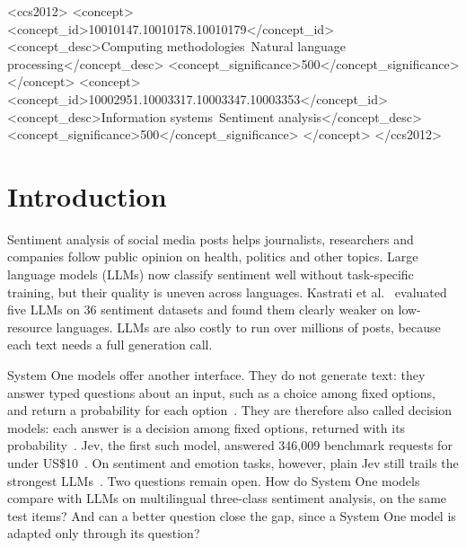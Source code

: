 \documentclass[sigconf]{acmart}
\begin{document}
\begin{CCSXML}
<ccs2012>
 <concept>
  <concept_id>10010147.10010178.10010179</concept_id>
  <concept_desc>Computing methodologies~Natural language processing</concept_desc>
  <concept_significance>500</concept_significance>
 </concept>
 <concept>
  <concept_id>10002951.10003317.10003347.10003353</concept_id>
  <concept_desc>Information systems~Sentiment analysis</concept_desc>
  <concept_significance>500</concept_significance>
 </concept>
</ccs2012>
\end{CCSXML}



\maketitle

\section{Introduction}
Sentiment analysis of social media posts helps journalists, researchers and companies follow public opinion on health, politics and other topics. Large language models (LLMs) now classify sentiment well without task-specific training, but their quality is uneven across languages. Kastrati et al.~\cite{kastrati2026language} evaluated five LLMs on 36 sentiment datasets and found them clearly weaker on low-resource languages. LLMs are also costly to run over millions of posts, because each text needs a full generation call.

System One models offer another interface. They do not generate text: they answer typed questions about an input, such as a choice among fixed options, and return a probability for each option~\cite{typesafe2026jev}. They are therefore also called decision models: each answer is a decision among fixed options, returned with its probability~\cite{deusser2026jev,zhang2026decide}. Jev, the first such model, answered 346,009 benchmark requests for under US\$10~\cite{deusser2026jev}. On sentiment and emotion tasks, however, plain Jev still trails the strongest LLMs~\cite{zhang2026emojev}. Two questions remain open. How do System One models compare with LLMs on multilingual three-class sentiment analysis, on the same test items? And can a better question close the gap, since a System One model is adapted only through its question?
\end{document}

